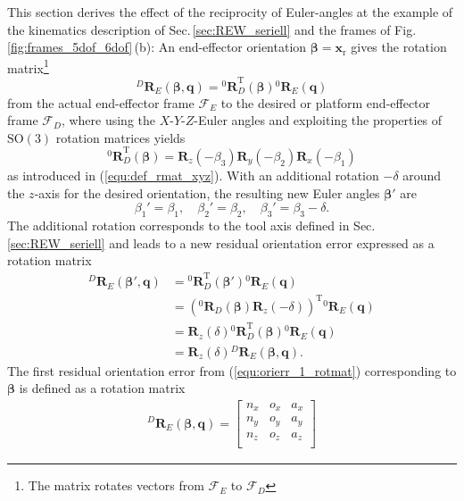 \documentclass[robotics,article,submit,moreauthors,pdftex]{Definitions/mdpi}
\newcommand{\bm}[1]{\boldsymbol{#1}}
\newcommand{\rotmat}[2]{{{ }^{#1}\boldsymbol{R}}_{#2}}
\newcommand{\transp}[0]{{\mathrm{T}}}
\newcommand{\ks}[1]{{\mathcal{F}}_{#1}}
\begin{document}
This section derives the effect of the reciprocity of Euler-angles at the example of the kinematics description of Sec.\,\ref{sec:REW_seriell} and the frames of Fig.\,\ref{fig:frames_5dof_6dof}\,(b):
%
An end-effector orientation $\bm{\beta}=\bm{x}_{\mathrm{r}}$ gives the rotation matrix\footnote{The matrix rotates vectors from $\ks{E}$ to $\ks{D}$}
%
\begin{equation}
\rotmat{D}{E}(\bm{\beta},\bm{q})
= 
\rotmat{0}{D}^\transp (\bm{\beta})\rotmat{0}{E}(\bm{q})
\label{equ:orierr_1_rotmat}
\end{equation}
%
from the actual end-effector frame $\ks{E}$ to the desired or platform end-effector frame $\ks{D}$,
where using the $X$-$Y$-$Z$-Euler angles and exploiting the properties of $\mathrm{SO(3)}$ rotation matrices yields
%
\begin{equation}
\rotmat{0}{D}^\transp(\bm{\beta})
=
\bm{R}_z(-\beta_3) \bm{R}_y(-\beta_2) \bm{R}_x(-\beta_1)
\end{equation}
%
as introduced in (\ref{equ:def_rmat_xyz}).
With an additional rotation $-\delta$ around the $z$-axis for the desired orientation, the resulting new Euler angles $\bm{\beta}'$ are
%
\begin{equation}
\beta_1'=\beta_1,  \quad \beta_2'=\beta_2,  \quad \beta_3'=\beta_3-\delta.
\end{equation}
%
The additional rotation corresponds to the tool axis defined in Sec.\,\ref{sec:REW_seriell} %
and leads to a new residual orientation error expressed as a rotation matrix
%
\begin{align}
    \rotmat{D}{E}(\bm{\beta}',\bm{q})
    &=
    \rotmat{0}{D}^\transp (\bm{\beta}') \rotmat{0}{E}(\bm{q}) \nonumber\\
    &=
    \left(\rotmat{0}{D}(\bm{\beta})\bm{R}_z(-\delta)\right)^\transp \rotmat{0}{E}(\bm{q}) \nonumber \\
    &=
    \bm{R}_z(\delta) \rotmat{0}{D}^\transp (\bm{\beta}) \rotmat{0}{E}(\bm{q}) \nonumber \\
    &=
    \bm{R}_z(\delta) \rotmat{D}{E}(\bm{\beta},\bm{q}).
    \label{equ:orierr_2_rotmat}
\end{align}
%
The first residual orientation error from (\ref{equ:orierr_1_rotmat}) corresponding to $\bm{\beta}$ is defined as a rotation matrix
%
\begin{align}
    \rotmat{D}{E}(\bm{\beta},\bm{q})
    =
    \begin{bmatrix}
        {n_x}&{o_x}&{a_x} \\
        {n_y}&{o_y}&{a_y} \\ 
        {n_z}&{o_z}&{a_z} \\ 
    \end{bmatrix}
    \label{equ:orierr_1_rotmat_def}
\end{align}
\end{document}
